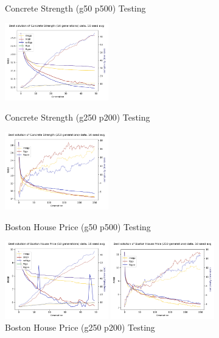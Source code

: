 \documentclass[a4paper, twocolumn]{article}
\begin{document}
\begin{figure}[!htb]
	\caption{Concrete Strength (g50 p500) Testing}
	\includegraphics[width=0.40\textwidth]{Concrete Strength (50 generations)-best-evo}
	\caption{Concrete Strength (g250 p200) Testing}
	\includegraphics[width=0.40\textwidth]{Concrete Strength (250 generations)-best-evo}
	\caption{Boston House Price (g50 p500) Testing}
	\includegraphics[width=0.40\textwidth]{Boston House Price (50 generations)-best-evo}
	\caption{Boston House Price (g250 p200) Testing}
	\includegraphics[width=0.40\textwidth]{Boston House Price (250 generations)-best-evo}
\end{figure}
\end{document}
